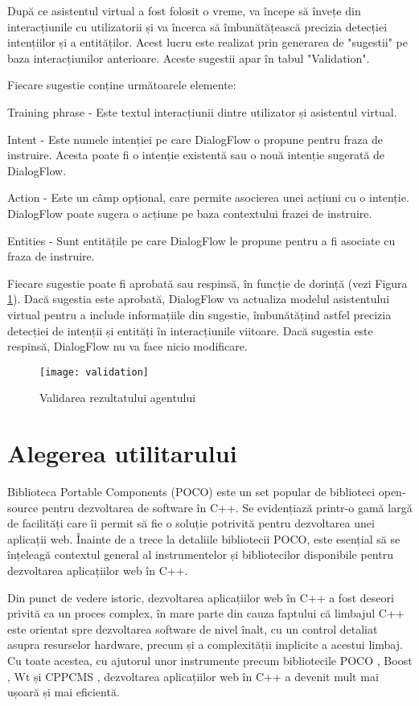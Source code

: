 După ce asistentul virtual a fost folosit o vreme, va începe să învețe din interacțiunile cu utilizatorii și va încerca să îmbunătățească precizia detecției intențiilor și a entităților. Acest lucru este realizat prin generarea de "sugestii" pe baza interacțiunilor anterioare. Aceste sugestii apar în tabul "Validation".

Fiecare sugestie conține următoarele elemente:

Training phrase - Este textul interacțiunii dintre utilizator și asistentul virtual.

Intent - Este numele intenției pe care DialogFlow o propune pentru fraza de instruire. Acesta poate fi o intenție existentă sau o nouă intenție sugerată de DialogFlow.

Action - Este un câmp opțional, care permite asocierea unei acțiuni cu o intenție. DialogFlow poate sugera o acțiune pe baza contextului frazei de instruire.

Entities - Sunt entitățile pe care DialogFlow le propune pentru a fi asociate cu fraza de instruire.

Fiecare sugestie poate fi aprobată sau respinsă, în funcție de dorință (vezi Figura \ref{fig:validation}). Dacă sugestia este aprobată, DialogFlow va actualiza modelul asistentului virtual pentru a include informațiile din sugestie, îmbunătățind astfel precizia detecției de intenții și entități în interacțiunile viitoare. Dacă sugestia este respinsă, DialogFlow nu va face nicio modificare.

\begin{figure}[h]
    \centering
    \texttt{[image: validation]}
    \caption{Validarea rezultatului agentului}
    \label{fig:validation}
\end{figure}

\section{Alegerea utilitarului}

Biblioteca Portable Components (POCO) este un set popular de biblioteci open-source pentru dezvoltarea de software în C++. Se evidențiază printr-o gamă largă de facilități care îi permit să fie o soluție potrivită pentru dezvoltarea unei aplicații web. Înainte de a trece la detaliile bibliotecii POCO, este esențial să se înțeleagă contextul general al instrumentelor și bibliotecilor disponibile pentru dezvoltarea aplicațiilor web în C++.

Din punct de vedere istoric, dezvoltarea aplicațiilor web în C++ a fost deseori privită ca un proces complex, în mare parte din cauza faptului că limbajul C++ este orientat spre dezvoltarea software de nivel înalt, cu un control detaliat asupra resurselor hardware, precum și a complexității implicite a acestui limbaj. Cu toate acestea, cu ajutorul unor instrumente precum bibliotecile POCO \cite{poco-docs}, Boost \cite{boost-docs}, Wt \cite{wt-docs} și CPPCMS \cite{cppcms-docs}, dezvoltarea aplicațiilor web în C++ a devenit mult mai ușoară și mai eficientă.

